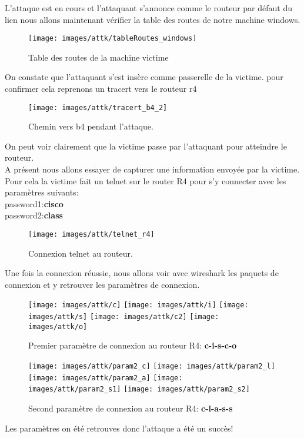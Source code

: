 L'attaque est en cours et l'attaquant s'annonce comme le routeur par défaut du lien
nous allons maintenant vérifier la table des routes de notre machine windows.
\begin{figure}[H]
    \centering
    \texttt{[image: images/attk/tableRoutes\_windows]}
    \caption{Table des routes de la machine victime}
    \label{fig:win_route_table}
\end{figure}
On constate que l'attaquant s'est insère comme passerelle de la victime.
pour confirmer cela reprenons un tracert vers le routeur r4
\begin{figure}[H]
    \centering
    \texttt{[image: images/attk/tracert\_b4\_2]}
    \caption{Chemin vers b4 pendant l'attaque.}
    \label{fig:tracert_b42}
\end{figure}
On peut voir clairement que la victime passe par l'attaquant pour atteindre le routeur.\\

A présent nous allons essayer de capturer une information envoyée par la victime.
Pour cela la victime fait un telnet sur le router R4 pour s'y connecter avec les paramètres suivants:\\
password1:\textbf{cisco}\\
password2:\textbf{class}
\begin{figure}[H]
    \centering
    \texttt{[image: images/attk/telnet\_r4]}
    \caption{Connexion telnet au routeur.}
    \label{fig:telnetr4}
\end{figure}

Une fois la connexion réussie, nous allons voir avec wireshark les paquets de connexion et y retrouver les paramètres de connexion.
\begin{figure}[H]
    \centering
    \texttt{[image: images/attk/c]}
    \texttt{[image: images/attk/i]}
    \texttt{[image: images/attk/s]}
    \texttt{[image: images/attk/c2]}
    \texttt{[image: images/attk/o]}   
    \caption{Premier paramètre de connexion au routeur R4: \textbf{c-i-s-c-o}}
    \label{fig:param_conn_r4}
\end{figure}
\begin{figure}[H]
    \centering
    \texttt{[image: images/attk/param2\_c]}
    \texttt{[image: images/attk/param2\_l]}
    \texttt{[image: images/attk/param2\_a]}
    \texttt{[image: images/attk/param2\_s1]}
    \texttt{[image: images/attk/param2\_s2]}
    \caption{Second paramètre de connexion au routeur R4: \textbf{c-l-a-s-s}}
    \label{fig:param_conn2}
\end{figure}
Les paramètres on été retrouves donc l'attaque a été un succès!


